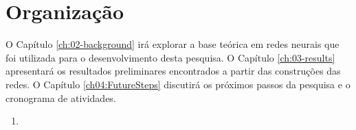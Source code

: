 \section{Organização}
\label{sec:organization}

O Capítulo \ref{ch:02-background} irá explorar a base teórica em redes neurais que foi utilizada para o desenvolvimento desta pesquisa. O Capítulo \ref{ch:03-results} apresentará os resultados preliminares encontrados a partir das construções das redes. O Capítulo \ref{ch04:FutureSteps} discutirá os próximos passos da pesquisa e o cronograma de atividades.
\begin{enumerate}
\item 
\end{enumerate}
